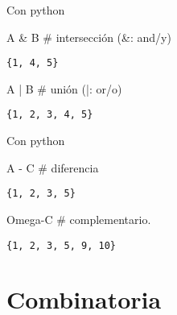 \documentclass[
  ignorenonframetext,
  aspectratio=169]{beamer}
\newenvironment{Shaded}{\begin{snugshade}}{\end{snugshade}}
\newcommand{\CommentTok}[1]{\textcolor[rgb]{0.37,0.37,0.37}{#1}}
\newcommand{\NormalTok}[1]{\textcolor[rgb]{0.00,0.23,0.31}{#1}}
\newcommand{\OperatorTok}[1]{\textcolor[rgb]{0.37,0.37,0.37}{#1}}
\begin{document}
\begin{frame}[fragile]{Con python}
\protect\hypertarget{con-python-2}{}
\begin{Shaded}
\begin{Highlighting}[]
\NormalTok{A }\OperatorTok{\&}\NormalTok{ B   }\CommentTok{\# intersección (\&: and/y)}
\end{Highlighting}
\end{Shaded}

\begin{verbatim}
{1, 4, 5}
\end{verbatim}

\begin{Shaded}
\begin{Highlighting}[]
\NormalTok{A }\OperatorTok{|}\NormalTok{ B   }\CommentTok{\# unión (|: or/o)}
\end{Highlighting}
\end{Shaded}

\begin{verbatim}
{1, 2, 3, 4, 5}
\end{verbatim}
\end{frame}

\begin{frame}[fragile]{Con python}
\protect\hypertarget{con-python-3}{}
\begin{Shaded}
\begin{Highlighting}[]
\NormalTok{A }\OperatorTok{{-}}\NormalTok{ C   }\CommentTok{\# diferencia }
\end{Highlighting}
\end{Shaded}

\begin{verbatim}
{1, 2, 3, 5}
\end{verbatim}

\begin{Shaded}
\begin{Highlighting}[]
\NormalTok{Omega}\OperatorTok{{-}}\NormalTok{C }\CommentTok{\# complementario.}
\end{Highlighting}
\end{Shaded}

\begin{verbatim}
{1, 2, 3, 5, 9, 10}
\end{verbatim}
\end{frame}

\hypertarget{combinatoria}{%
\section{Combinatoria}\label{combinatoria}}
\end{document}
